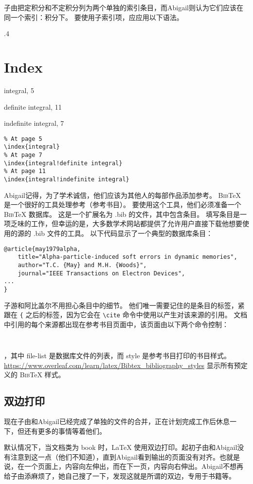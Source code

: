 子由把定积分和不定积分列为两个单独的索引条目，而Abigail则认为它们应该在同一个索引：积分下。 要使用子索引项，应应用以下语法。
\begin{miniexammar}{.4\textandmarginlen}{
\section*{Index}
integral, 5
\par \hspace{2em} definite integral, 11
\par \hspace{2em} indefinite integral, 7
}
\begin{lstlisting}
% At page 5
\index{integral}
% At page 7
\index{integral!definite integral}
% At page 11
\index{integral!indefinite integral}
\end{lstlisting}
\end{miniexammar}

Abigail记得，为了学术诚信，他们应该为其他人的每部作品添加参考。 B\textsc{ib}\TeX{} 是一个很好的工具处理参考（参考书目）。 要使用这个工具，他们必须准备一个 B\textsc{ib}\TeX{} 数据库。 这是一个扩展名为 .bib 的文件，其中包含条目。 填写条目是一项乏味的工作，但幸运的是，大多数学术网站都提供了允许用户直接下载他想要使用的源的 .bib 文件的工具。 以下代码显示了一个典型的数据库条目：
\begin{lstlisting}
@article{may1979alpha,
	title="Alpha-particle-induced soft errors in dynamic memories",
	author="T.C. {May} and M.H. {Woods}",
	journal="IEEE Transactions on Electron Devices",
...
}
\end{lstlisting}
子游和阿比盖尔不用担心条目中的细节。 他们唯一需要记住的是条目的标签，紧跟在 \verb={= 之后的标签，因为它会在 \verb=\cite= 命令中使用以产生对该来源的引用。 文档中引用的每个来源都出现在参考书目页面中，该页面由以下两个命令控制：
\begin{lstlisting}


\end{lstlisting}
，其中 file-list 是数据库文件的列表，而 style 是参考书目打印的书目样式。 \url{https://www.overleaf.com/learn/latex/Bibtex_bibliography_styles} 显示所有预定义的 B\textsc{ib}\TeX{} 样式。

\subsection{双边打印}
现在子由和Abigail已经完成了单独的文件的合并，正在计划完成工作后休息一下，但还有更多的事情等着他们。

默认情况下，当文档类为 book 时，\LaTeX{} 使用双边打印。起初子由和Abigail没有注意到这一点（他们不知道），直到Abigail看到输出的页面没有对齐。也就是说，在一个页面上，内容向左伸出，而在下一页，内容向右伸出。Abigail不想再给子由添麻烦了，她自己搜了一下，发现这就是所谓的双边，专用于书籍等。


